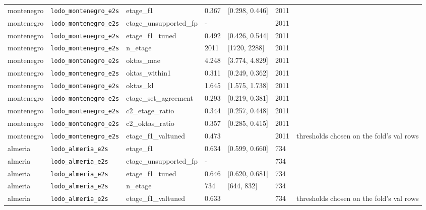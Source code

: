 \begin{center}
{\begin{tabular}{llllllp{7.3cm}}
montenegro & \texttt{lodo\_\allowbreak{}montenegro\_\allowbreak{}e2s} & etage\_f1 & 0.367 & [0.298, 0.446] & 2011 &  \\
montenegro & \texttt{lodo\_\allowbreak{}montenegro\_\allowbreak{}e2s} & etage\_unsupported\_fp & - &  & 2011 &  \\
montenegro & \texttt{lodo\_\allowbreak{}montenegro\_\allowbreak{}e2s} & etage\_f1\_tuned & 0.492 & [0.426, 0.544] & 2011 &  \\
montenegro & \texttt{lodo\_\allowbreak{}montenegro\_\allowbreak{}e2s} & n\_etage & 2011 & [1720, 2288] & 2011 &  \\
montenegro & \texttt{lodo\_\allowbreak{}montenegro\_\allowbreak{}e2s} & oktas\_mae & 4.248 & [3.774, 4.829] & 2011 &  \\
montenegro & \texttt{lodo\_\allowbreak{}montenegro\_\allowbreak{}e2s} & oktas\_within1 & 0.311 & [0.249, 0.362] & 2011 &  \\
montenegro & \texttt{lodo\_\allowbreak{}montenegro\_\allowbreak{}e2s} & oktas\_kl & 1.645 & [1.575, 1.738] & 2011 &  \\
montenegro & \texttt{lodo\_\allowbreak{}montenegro\_\allowbreak{}e2s} & etage\_set\_agreement & 0.293 & [0.219, 0.381] & 2011 &  \\
montenegro & \texttt{lodo\_\allowbreak{}montenegro\_\allowbreak{}e2s} & c2\_etage\_ratio & 0.344 & [0.257, 0.448] & 2011 &  \\
montenegro & \texttt{lodo\_\allowbreak{}montenegro\_\allowbreak{}e2s} & c2\_oktas\_ratio & 0.357 & [0.285, 0.415] & 2011 &  \\
montenegro & \texttt{lodo\_\allowbreak{}montenegro\_\allowbreak{}e2s} & etage\_f1\_valtuned & 0.473 &  & 2011 & thresholds chosen on the fold's val rows \\
almeria & \texttt{lodo\_\allowbreak{}almeria\_\allowbreak{}e2s} & etage\_f1 & 0.634 & [0.599, 0.660] & 734 &  \\
almeria & \texttt{lodo\_\allowbreak{}almeria\_\allowbreak{}e2s} & etage\_unsupported\_fp & - &  & 734 &  \\
almeria & \texttt{lodo\_\allowbreak{}almeria\_\allowbreak{}e2s} & etage\_f1\_tuned & 0.646 & [0.620, 0.681] & 734 &  \\
almeria & \texttt{lodo\_\allowbreak{}almeria\_\allowbreak{}e2s} & n\_etage & 734 & [644, 832] & 734 &  \\
almeria & \texttt{lodo\_\allowbreak{}almeria\_\allowbreak{}e2s} & etage\_f1\_valtuned & 0.633 &  & 734 & thresholds chosen on the fold's val rows \\

\end{tabular}}
\end{center}
